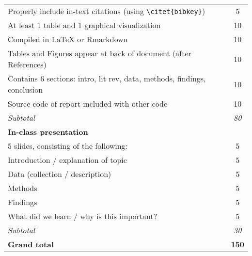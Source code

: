 \documentclass[12pt,english]{article}
\begin{document}
\begin{center}
\begin{tabular}{l|c|c}
Properly include in-text citations (using \texttt{\textbackslash citet\{bibkey\}})           &               & 5                        \\
At least 1 table and 1 graphical visualization                                               &               & 10                       \\
Compiled in LaTeX or Rmarkdown                                                               &               & 10                       \\
Tables and Figures appear at back of document (after References)                             &               & 10                       \\
Contains 6 sections: intro, lit rev, data, methods, findings, conclusion                     &               & 10                       \\
Source code of report included with other code                                               &               & 10                       \\
\hline
\textit{Subtotal}                                                                            &               & \textit{80}              \\
\hline
\textbf{In-class presentation}                                                               &               &                          \\
5 slides, consisting of the following:                                                       &               & 5                        \\
Introduction / explanation of topic                                                          &               & 5                        \\
Data (collection / description)                                                              &               & 5                        \\
Methods                                                                                      &               & 5                        \\
Findings                                                                                     &               & 5                        \\
What did we learn / why is this important?                                                   &               & 5                        \\
\hline
\textit{Subtotal}                                                                            &               & \textit{30}              \\
\hline
\textbf{Grand total}                                                                         &               & \textbf{150}            \\
\hline
\end{tabular}
\end{center}

\end{document}
